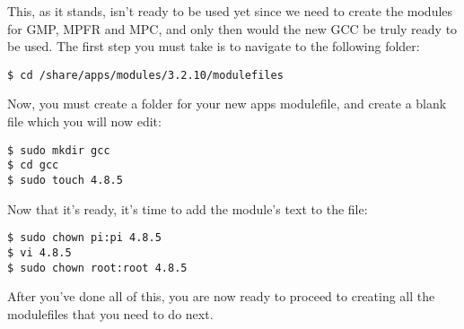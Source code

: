\documentclass[]{article}
\begin{document}
This, as it stands, isn't ready to be used yet since we need to create the modules for GMP, MPFR and MPC, and only then would the new
GCC be truly ready to be used. The first step you must take is to navigate to the following folder:
\begin{lstlisting}
$ cd /share/apps/modules/3.2.10/modulefiles
\end{lstlisting}
Now, you must create a folder for your new apps modulefile, and create a blank file which you will now edit:
\begin{lstlisting}
$ sudo mkdir gcc
$ cd gcc
$ sudo touch 4.8.5
\end{lstlisting}
Now that it's ready, it's time to add the module's text to the file:
\begin{lstlisting}
$ sudo chown pi:pi 4.8.5
$ vi 4.8.5
$ sudo chown root:root 4.8.5
\end{lstlisting}
After you've done all of this, you are now ready to proceed to creating all the modulefiles that you need to do next.
\end{document}
